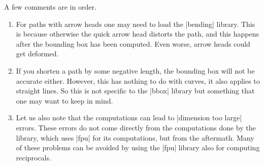 A few comments are in order.
%
\begin{enumerate}
    \item For paths with arrow heads one may need to load the |bending|
        library. This is because otherwise the quick arrow head distorts the
        path, and this happens after the bounding box has been computed. Even
        worse, arrow heads could get deformed.
    \item If you shorten a path by some negative length, the bounding box will
        not be accurate either. However, this has nothing to do with curves, it
        also applies to straight lines. So this is not specific to the |bbox|
        library but something that one may want to keep in mind.
    \item Let us also note that the computations can lead to
        |dimension too large| errors. These errors do not come directly from
        the computations done by the library, which uses |fpu| for its
        computations, but from the aftermath. Many of these problems can be
        avoided by using the |fpu| library also for computing reciprocals.
\end{enumerate}

\endinput


